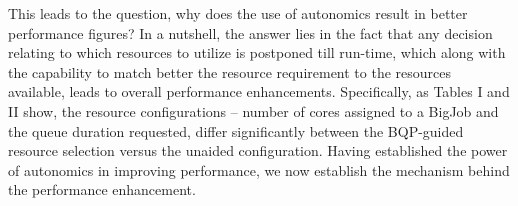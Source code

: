\documentclass{sig-alternate}
\newcommand{\up}{\vspace*{-0.3em}}
\begin{document}
\begin{table}
\caption{A table showing the configurations chosen
  on Ranger, with and without BQP. Notice how the use
  of BQP has small but significant changes in the queue, size and duration
  of the BigJob changes. }\up\up\up\up\up\up\up\up\up\up\up\up
\end{table}

This leads to the question, why does the use of autonomics result in
better performance figures? In a nutshell, the answer lies in the fact
that any decision relating to which resources to utilize is postponed
till run-time, which along with the capability to match better the
resource requirement to the resources available, leads to overall
performance enhancements. Specifically, as Tables I and II show, the
resource configurations -- number of cores assigned to a BigJob and
the queue duration requested, differ significantly between the
BQP-guided resource selection versus the unaided configuration.
Having established the power of autonomics in improving performance,
we now establish the mechanism behind the performance enhancement.
\end{document}
